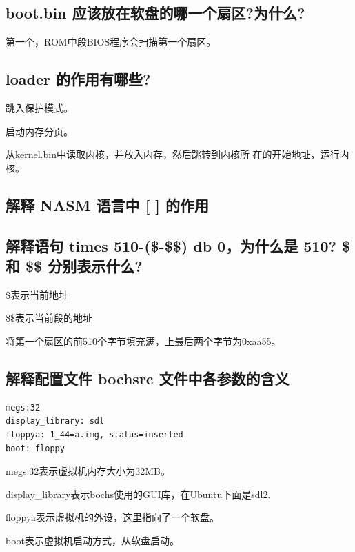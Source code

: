 \documentclass{article}
\begin{document}
\subsection{boot.bin 应该放在软盘的哪一个扇区?为什么?}
第一个，ROM中段BIOS程序会扫描第一个扇区。
\subsection{loader 的作用有哪些?}
跳入保护模式。

启动内存分页。

从kernel.bin中读取内核，并放入内存，然后跳转到内核所 在的开始地址，运行内核。
\subsection{解释 NASM 语言中 [ ] 的作用}


\subsection{解释语句 times 510-(\$-\$\$) db 0，为什么是 510? \$ 和 \$\$ 分别表示什么?}
\$表示当前地址

\$\$表示当前段的地址

将第一个扇区的前510个字节填充满，上最后两个字节为0xaa55。
\subsection{解释配置文件 bochsrc 文件中各参数的含义}
\begin{lstlisting}
megs:32
display_library: sdl
floppya: 1_44=a.img, status=inserted 
boot: floppy
\end{lstlisting}
megs:32表示虚拟机内存大小为32MB。

display\_library表示bochs使用的GUI库，在Ubuntu下面是sdl2.

floppya表示虚拟机的外设，这里指向了一个软盘。

boot表示虚拟机启动方式，从软盘启动。
\end{document}

